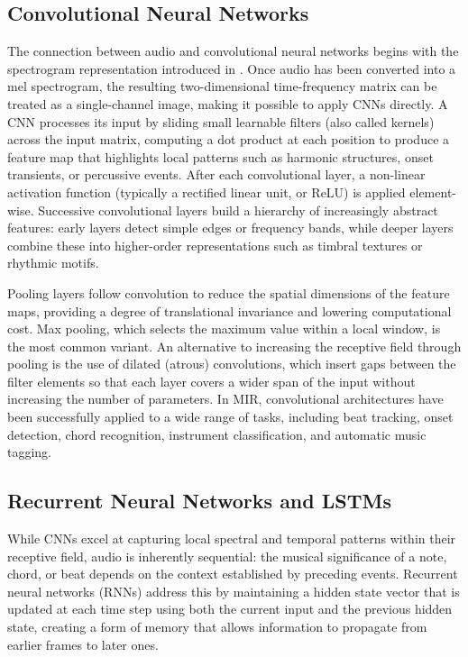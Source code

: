 \subsection{Convolutional Neural Networks}

The connection between audio and convolutional neural networks begins with the spectrogram representation introduced in . Once audio has been converted into a mel spectrogram, the resulting two-dimensional time-frequency matrix can be treated as a single-channel image, making it possible to apply CNNs directly.\cite{hendrikpurwins20191}   A CNN processes its input by sliding small learnable filters (also called kernels) across the input matrix, computing a dot product at each position to produce a feature map that highlights local patterns such as harmonic structures, onset transients, or percussive events.  After each convolutional layer, a non-linear activation function (typically a rectified linear unit, or ReLU) is applied element-wise. Successive convolutional layers build a hierarchy of increasingly abstract features: early layers detect simple edges or frequency bands, while deeper layers combine these into higher-order representations such as timbral textures or rhythmic motifs.

Pooling layers follow convolution to reduce the spatial dimensions of the feature maps, providing a degree of translational invariance and lowering computational cost. Max pooling, which selects the maximum value within a local window, is the most common variant. An alternative to increasing the receptive field through pooling is the use of dilated (atrous) convolutions, which insert gaps between the filter elements so that each layer covers a wider span of the input without increasing the number of parameters.  In MIR, convolutional architectures have been successfully applied to a wide range of tasks, including beat tracking, onset detection, chord recognition, instrument classification, and automatic music tagging.\cite{hendrikpurwins20191}  

\subsection{Recurrent Neural Networks and LSTMs}

While CNNs excel at capturing local spectral and temporal patterns within their receptive field, audio is inherently sequential: the musical significance of a note, chord, or beat depends on the context established by preceding events. Recurrent neural networks (RNNs) address this by maintaining a hidden state vector that is updated at each time step using both the current input and the previous hidden state, creating a form of memory that allows information to propagate from earlier frames to later ones.\cite{hendrikpurwins20191}  

